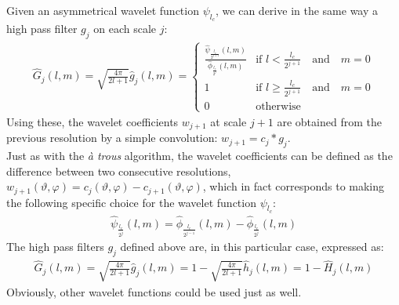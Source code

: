 Given an asymmetrical wavelet function $\psi_{l_c}$, we can derive in the same way a high pass filter $g_j$ on each scale $j$:
\begin{eqnarray}
 \hat{G}_{j}(l,m) = \sqrt{\frac{4\pi}{2l+1} }  \hat{g}_{j}(l,m) = \left\{
  \begin{array}{ll}
 \frac {   \hat \psi_{\frac{l_{c}}{2^{j+1}} }(l,m)   }   {  \hat  \phi_{  \frac{l_{c}}{2^{j}} }(l,m)   } & \mbox{if }  l  < \frac{ l_{c}} {2^{j+1}} \quad \textrm{and}\quad m = 0\\ 
1 &\mbox{if }  l  \ge \frac{ l_{c}} {2^{j+1}} \quad \textrm{and}\quad m = 0\\ 
0&  \mbox{otherwise }\
  \end{array}
  \right.
\end{eqnarray}
Using these, the wavelet coefficients $w_{j+1} $ at scale $j+1$ are obtained from the previous resolution by a simple convolution: $w_{j+1} = c_{j} * g_j$.\\

Just as with the \emph{\`a trous} algorithm, the wavelet coefficients can be defined as the difference between two consecutive resolutions, 
$w_{j+1}(\vartheta, \varphi) = c_{j}(\vartheta, \varphi) - c_{j+1}(\vartheta, \varphi)$, which in fact corresponds to making the following 
specific choice for the wavelet function $\psi_{l_c}$:
\begin{eqnarray}
\hat \psi_{\frac{l_c}{2^{j}}}(l,m) = \hat \phi_{\frac{l_c}{2^{j-1}}} (l,m)  - \hat \phi_{\frac{l_c}{2^{j}}}(l,m)
\end{eqnarray}
The high pass filters $g_j$ defined above are, in this particular case, expressed as: 
\begin{eqnarray}
 \hat{G}_{j}(l,m) = \sqrt{\frac{4\pi}{2l+1} } \hat{g}_{j}(l,m) =  1 - \sqrt{\frac{4\pi}{2l+1} } \hat{h}_j(l,m)   =   1 - \hat{H}_j(l,m) 
\end{eqnarray}
Obviously, other wavelet functions could be used just as well.


